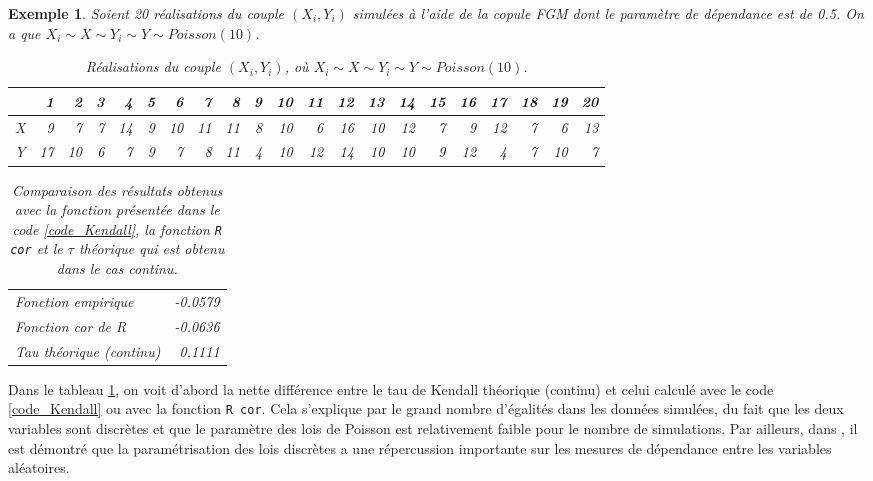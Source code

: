 \documentclass{article}
\newtheorem{exemple}{Exemple}
\begin{document}
	\begin{exemple}\label{exemple_code1}
		Soient 20 réalisations du couple $(X_i, Y_i)$ simulées à l'aide de la copule FGM dont le paramètre de dépendance est de 0.5.
		On a que $X_i \sim X \sim Y_i \sim Y \sim Poisson(10)$.
		\begin{table}[H]
			\centering
			\begin{tabular}{rrrrrrrrrrrrrrrrrrrrr}
				\hline
				& 1 & 2 & 3 & 4 & 5 & 6 & 7 & 8 & 9 & 10 & 11 & 12 & 13 & 14 & 15 & 16 & 17 & 18 & 19 & 20 \\ 
				\hline
				X & 9 & 7 & 7 & 14 & 9 & 10 & 11 & 11 & 8 & 10 & 6 & 16 & 10 & 12 & 7 & 9 & 12 & 7 & 6 & 13 \\ 
				Y & 17 & 10 & 6 & 7 & 9 & 7 & 8 & 11 & 4 & 10 & 12 & 14 & 10 & 10 & 9 & 12 & 4 & 7 & 10 & 7 \\ 
				\hline
			\end{tabular}
		\caption{Réalisations du couple $(X_i,Y_i)$, où $X_i \sim X \sim Y_i \sim Y \sim Poisson(10)$. }
		\end{table}
	
	\begin{table}[H]
		\centering
		\begin{tabular}{lr}
			\hline
			Fonction empirique & -0.0579 \\ 
			Fonction cor de R & -0.0636 \\ 
			Tau théorique (continu) & 0.1111 \\ 
			\hline
		\end{tabular}
	\caption{Comparaison des résultats obtenus avec la fonction présentée dans le code \ref{code_Kendall}, la fonction \texttt{R cor} et le $\tau$ théorique qui est obtenu dans le cas continu.}
	\label{tbl_Resultats_Code1}
	\end{table}
	\end{exemple}	

	Dans le tableau \ref{tbl_Resultats_Code1}, on voit d'abord la nette différence entre le tau de Kendall théorique (continu) et celui calculé avec le code \ref{code_Kendall} ou avec la fonction \texttt{R cor}. Cela s'explique par le grand nombre d'égalités dans les données simulées, du fait que les deux variables sont discrètes et que le paramètre des lois de Poisson est relativement faible pour le nombre de simulations. Par ailleurs, dans \cite{Nikoloulopoulos_Kendall_discret}, il est démontré que la paramétrisation des lois discrètes a une répercussion importante sur les mesures de dépendance entre les variables aléatoires.\\
 
	
	\newpage
	
	
	 
	 
\end{document}
